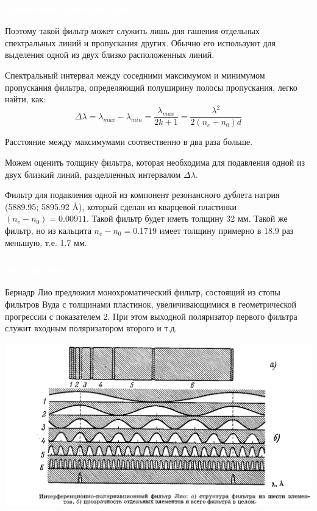 \documentclass[aspectratio=169]{beamer}
\begin{document}
\begin{frame}
\frametitle{\textcolor{white}{Применение фильтра Вуда}}

Поэтому такой фильтр может служить лишь для гашения отдельных спектральных линий и пропускания других. Обычно его используют для выделения одной из двух близко расположенных линий.

Спектральный интервал между соседними максимумом и минимумом пропускания фильтра, определяющий полуширину полосы пропускания, легко найти, как:
\begin{equation*}
    \Delta \lambda = \lambda_{max} - \lambda_{min} = \frac{\lambda_{max}}{2k +1} = \frac{\lambda^2}{2 (n_e - n_0) d}
\end{equation*}

Расстояние между максимумами соотвественно в два раза больше.

Можем оценить толщину фильтра, которая необходима для подавления одной из двух близкий линий, разделленных интервалом $\Delta \lambda$.

Фильтр для подавления одной из компонент резонансного дублета натрия (5889.95; 5895.92 \AA), который сделан из кварцевой пластинки $(n_e - n_0) = 0.00911$. Такой фильтр будет иметь толщину 32 мм. Такой же фильтр, но из кальцита $n_e-n_0 = 0.1719$ имеет толщину примерно в 18.9 раз меньшую, т.е. 1.7 мм.
\end{frame}

\begin{frame}
\frametitle{\textcolor{white}{Фильтр Лио}}
Бернадр Лио предложил монохроматический фильтр, состоящий из стопы фильтров Вуда с толщинами пластинок, увеличивающимися в геометрической прогрессии с показателем 2. При этом выходной поляризатор первого фильтра служит входным поляризатором второго и т.д.

\begin{center}
\includegraphics[scale=0.175]{03.png}    
\end{center}

\end{frame}
\end{document}
